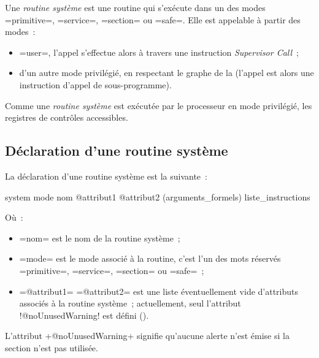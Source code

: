 
Une \emph{routine système} est une routine qui s'exécute dans un des modes \omnibus=primitive=, \omnibus=service=, \omnibus=section= ou \omnibus=safe=. Elle est appelable à partir des modes~:
\begin{itemize}
 \item \omnibus=user=, l'appel s'effectue alors à travers une instruction \emph{Supervisor Call}~;
  \item d'un autre mode privilégié, en respectant le graphe de la  (l'appel est alors une instruction d'appel de sous-programme).
\end{itemize}

Comme une \emph{routine système} est exécutée par le processeur en mode privilégié, les registres de contrôles accessibles.




\subsection{Déclaration d'une routine système}


La déclaration d'une routine système est la suivante~:
\begin{OMNIBUS}
system mode nom @attribut1 @attribut2 (arguments_formels) {
  liste_instructions
}
\end{OMNIBUS}
Où~:
\begin{itemize}
  \item \omnibus=nom= est le nom de la routine système~;
  \item \omnibus=mode= est le mode associé à la routine, c'est l'un des mots réservés \omnibus=primitive=, \omnibus=service=, \omnibus=section= ou \omnibus=safe=~;
  \item \omnibus=@attribut1= \omnibus=@attribut2= est une liste éventuellement vide d'attributs associés à la routine système~; actuellement, seul l'attribut \omnibus!@noUnusedWarning! est défini ().
\end{itemize}











L'attribut \omnibus+@noUnusedWarning+ signifie qu'aucune alerte n'est émise si la section n'est pas utilisée.




















